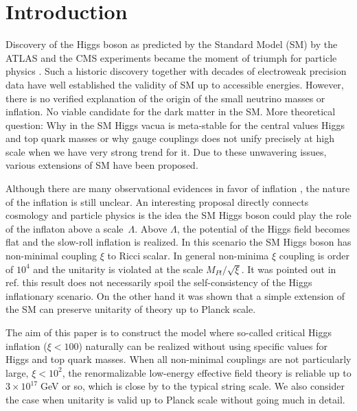 \documentclass[aps,prd,preprint,superscriptaddress,showpacs,ctexart]{revtex4-1}
\begin{document}
\section{Introduction}

Discovery of the Higgs boson as predicted by the Standard Model (SM)
by the ATLAS and the CMS experiments became the moment of triumph
for particle physics \cite{ATLAS,CMS,moriond2013}. Such a historic
discovery together with decades of electroweak precision data have
well established the validity of SM up to accessible energies. However,
there is no verified explanation of the origin of the small neutrino
masses or inflation. No viable candidate for the dark matter in the
SM. More theoretical question: Why in the SM Higgs vacua is meta-stable
for the central values Higgs and top quark masses \cite{Buttazzo:2013uya} or why gauge couplings
does not unify precisely at high scale when we have very strong trend
for it. Due to these unwavering issues, various extensions of SM have
been proposed.

Although there are many observational evidences in favor of inflation \cite{Staro},
the nature of the inflation is still unclear. An interesting proposal
directly connects cosmology and particle physics is the idea the SM
Higgs boson could play the role of the inflaton \cite{Bezrukov:2007ep}
above a scale~$\Lambda$. Above $\Lambda$, the potential of the
Higgs field becomes flat and the slow-roll inflation is realized.
In this scenario the SM Higgs boson has non-minimal coupling $\xi$
to Ricci scalar. In general non-minima $\xi$ coupling is order of
$10^{4}$ and the unitarity is violated at the scale $M_{Pl}/\sqrt{\xi}$.
It was pointed out in ref. \cite{Bezrukov:2010jz} this result does
not necessarily spoil the self-consistency of the Higgs inflationary
scenario. On the other hand it was shown that a simple extension \cite{Giudice:2010ka}
of the SM can preserve unitarity of theory up to Planck scale.

The aim of this paper is to construct the model where so-called critical
\cite{Bezrukov:2014bra} Higgs inflation ($\xi<100$) naturally can
be realized without using specific values for Higgs and top quark
masses. When all non-minimal couplings are not particularly large,
$\xi<10^{2}$, the renormalizable low-energy effective field theory
is reliable up to $3\times10^{17}\;$GeV or so, which is close by
to the typical string scale. We also consider the case when unitarity
is valid up to Planck scale without going much in detail.
\end{document}

